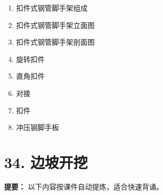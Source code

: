 \documentclass[UTF8,fontset=fandol,11pt]{ctexart}
\begin{document}
\begin{enumerate}[label=\arabic*.]
\item 扣件式钢管脚手架组成

\item 扣件式钢管脚手架立面图

\item 扣件式钢管脚手架剖面图

\item 旋转扣件

\item 直角扣件

\item 对接

\item 扣件

\item 冲压钢脚手板

\end{enumerate}

\newpage

\section*{34. 边坡开挖}


\begin{mainbox}

\textbf{提要：} 以下内容按课件自动提炼，适合快速背诵。

\end{mainbox}
\end{document}
